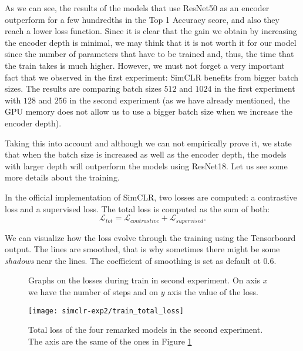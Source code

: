     As we can see, the results of the models that use ResNet50  as an encoder outperform for a few hundredths in the Top 1 Accuracy score, and also they reach a lower loss function. Since it is clear that the gain we obtain by increasing the encoder depth is minimal, we may think that it is not worth it for our model since the number of parameters that have to be trained and, thus, the time that the train takes is much higher. However, we must not forget a very important fact that we observed in the first experiment: SimCLR benefits from bigger batch sizes. The results are comparing batch sizes $512$ and $1024$ in the first experiment with $128$ and $256$ in the second experiment (as we have already mentioned, the GPU memory does not allow us to use a bigger batch size when we increase the encoder depth).

    Taking this into account and although we can not empirically prove it, we state that when the batch size is increased as well as the encoder depth, the models with larger depth will outperform the models using ResNet18. Let us see some more details about the training.

    In the official implementation of SimCLR, two losses are computed: a contrastive loss and a supervised loss. The total loss is computed as the sum of both:
    \[
    \mathcal L_{tot} = \mathcal L_{contrastive} + \mathcal L_{supervised}.    
    \]

    We can visualize how the loss evolve through the training using the Tensorboard output. The lines are smoothed, that is why sometimes there might be some \emph{shadows} near the lines. The coefficient of smoothing is set as default ot $0.6$. 
    \begin{figure}[htp] 
        \centering
        \hfill%
            \caption{Graphs on the losses during train in second experiment. On axis $x$ we have the number of steps and on $y$ axis the value of the loss.}
            \label{fig:exp2:both:losses}
    \end{figure}


\begin{figure}[H]
\centering
\texttt{[image: simclr-exp2/train\_total\_loss]}%
\caption{Total loss of the four remarked models in the second experiment. The axis are the same of the ones in Figure \ref{fig:exp2:both:losses} }
\label{fig:total:loss:exp2}%
\end{figure}

